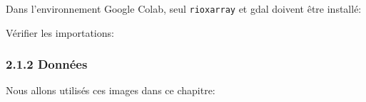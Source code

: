 Dans l'environnement Google Colab, seul \texttt{rioxarray} et gdal
doivent être installé:

\label{16ee207c}
\label{cb1}
\begin{Shaded}
\begin{Highlighting}[]
\OperatorTok{!}\OperatorTok{{-}}
\OperatorTok{!}\OperatorTok{{-}}\OperatorTok{{-}}\OperatorTok{{-}}
\OperatorTok{!}\OperatorTok{{-}}
\end{Highlighting}
\end{Shaded}

Vérifier les importations:

\label{2e63a7f1}
\label{cb2}
\begin{Shaded}
\begin{Highlighting}[]
\end{Highlighting}
\end{Shaded}

\subsubsection{\texorpdfstring{{2.1.2}
Données}{2.1.2 Données}}\label{donnuxe9es}

Nous allons utilisés ces images dans ce chapitre:

